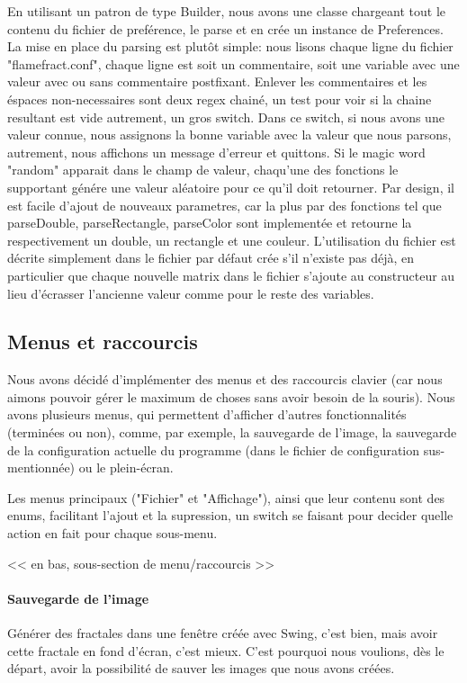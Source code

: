 \documentclass[a4paper]{article}
\begin{document}
En utilisant un patron de type Builder, nous avons une classe chargeant tout le contenu du fichier de preférence, le parse et en crée un instance de Preferences. La mise en place du parsing est plutôt simple: nous lisons chaque ligne du fichier "flamefract.conf", chaque ligne est soit un commentaire, soit une variable avec une valeur avec ou sans commentaire postfixant. Enlever les commentaires et les éspaces non-necessaires sont deux regex chainé, un test pour voir si la chaine resultant est vide autrement, un gros switch. Dans ce switch, si nous avons une valeur connue, nous assignons la bonne variable avec la valeur que nous parsons, autrement, nous affichons un message d'erreur et quittons. Si le magic word "random" apparait dans le champ de valeur, chaqu'une des fonctions le supportant génére une valeur aléatoire pour ce qu'il doit retourner. Par design, il est facile d'ajout de nouveaux parametres, car la plus par des fonctions tel que parseDouble, parseRectangle, parseColor sont implementée et retourne la respectivement un double, un rectangle et une couleur. L'utilisation du fichier est décrite simplement dans le fichier par défaut crée s'il n'existe pas déjà, en particulier que chaque nouvelle matrix dans le fichier s'ajoute au constructeur au lieu d'écrasser l'ancienne valeur comme pour le reste des variables.

\subsection*{Menus et raccourcis}
Nous avons décidé d'implémenter des menus et des raccourcis clavier (car nous aimons pouvoir gérer le maximum de choses sans avoir besoin de la souris). Nous avons plusieurs menus, qui permettent d'afficher d'autres fonctionnalités (terminées ou non), comme, par exemple, la sauvegarde de l'image, la sauvegarde de la configuration actuelle du programme (dans le fichier de configuration sus-mentionnée) ou le plein-écran.

Les menus principaux ("Fichier" et "Affichage"), ainsi que leur contenu sont des enums, facilitant l'ajout et la supression, un switch se faisant pour decider quelle action en fait pour chaque sous-menu.

<< en bas, sous-section de menu/raccourcis >>
\paragraph{Sauvegarde de l'image}
Générer des fractales dans une fenêtre créée avec Swing, c'est bien, mais avoir cette fractale en fond d'écran, c'est mieux. C'est pourquoi nous voulions, dès le départ, avoir la possibilité de sauver les images que nous avons créées.
\end{document}
